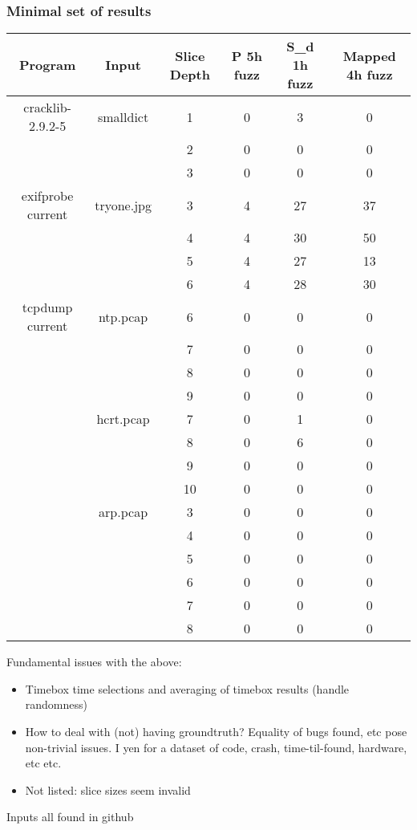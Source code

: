 \documentclass{beamer}
\begin{document}
\frame
{
	\frametitle{Minimal set of results}
	\tiny

	
	\begin{center}
	\begin{tabular}{| c | c | c  | c | c | c |}
	\hline
	Program            & Input        & Slice Depth  & P 5h fuzz & S\_d 1h fuzz & Mapped 4h fuzz \\ \hline
	cracklib-2.9.2-5 & smalldict   &  1                 & 0             & 3                    & 0  \\
	                 	&                  &  2 		  & 0 		   & 0 			& 0  \\
	                 	&             	   & 	3 		 & 0 		   & 0 			& 0  \\ \hline
	exifprobe current & tryone.jpg & 3 		 & 4 		   & 27 			& 37  \\ 
	                  &            & 4 & 4 & 30 & 50  \\ 
	                  &            & 5 & 4 & 27 & 13  \\ 
	                  &            & 6 & 4 & 28 & 30  \\ \hline
	tcpdump current   & ntp.pcap   & 6 & 0 & 0 & 0   \\ 
	                  &   & 7 & 0 & 0 & 0   \\ 
	                  &    & 8 & 0 & 0 & 0   \\ 
	                  &    & 9 & 0 & 0 & 0   \\ \cline{2-6}
                      & hcrt.pcap  & 7 & 0 & 1 & 0   \\
                      &            & 8 & 0 & 6 & 0   \\ 
                      &            & 9 & 0 & 0 & 0   \\
                      &            & 10 & 0 & 0 & 0  \\ \cline{2-6}
                      & arp.pcap   & 3 & 0 & 0 & 0  \\ 
                      &    & 4 & 0 & 0 & 0  \\                    
                      &    & 5 & 0 & 0 & 0  \\ 
                      &    & 6 & 0 & 0 & 0  \\
                      &    & 7 & 0 & 0 & 0  \\
                      &    & 8 & 0 & 0 & 0  \\ \hline                                                                 
	\end{tabular}
	\end{center}


	Fundamental issues with the above:	
	\begin{itemize}
	\item Timebox time selections and averaging of timebox results (handle randomness)
	\item How to deal with (not) having groundtruth? Equality of bugs found, etc pose non-trivial issues. I yen for a
	dataset of code, crash, time-til-found, hardware, etc etc.
	\item Not listed: slice sizes seem invalid
	\end{itemize}
	
	Inputs all found in github
}
\end{document}
